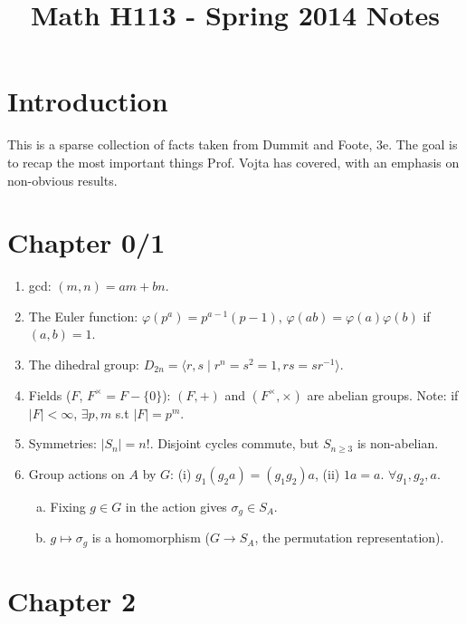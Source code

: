 \documentclass{article}
\title{Math H113 - Spring 2014 Notes}
\begin{document}
\maketitle

\section*{Introduction}

This is a sparse collection of facts taken from Dummit and Foote, 3e. The
goal is to recap the most important things Prof. Vojta has covered, with an
emphasis on non-obvious results.

\section*{Chapter 0/1}

\begin{enumerate}[1.]
    \item gcd: $(m, n) = am + bn$.
    \item The Euler function: $\varphi(p^a) = p^{a-1}(p - 1)$, $\varphi(ab)
        = \varphi(a)\varphi(b)$ if $(a, b) = 1$.
    \item The dihedral group: $D_{2n} = \langle r, s \mid r^n = s^2 = 1, rs
        = sr^{-1} \rangle$.
    \item Fields ($F$, $F^{\times} = F - \{0\}$): $(F, +)$ and $(F^{\times},
        \times)$ are abelian groups. Note: if $|F| < \infty$, $\exists p,m$
        s.t $|F| = p^m$.
    \item Symmetries: $|S_n| = n!$. Disjoint cycles commute, but $S_{n
        \geq 3}$ is non-abelian.
    \item Group actions on $A$ by $G$: (i) $g_1(g_2a) = (g_1g_2)a$, (ii) $1a
        = a$. $\forall g_1,g_2,a$.
        \begin{enumerate}[(a)]
            \item Fixing $g \in G$ in the action gives $\sigma_g \in S_A$.
            \item $g \mapsto \sigma_g$ is a homomorphism ($G \rightarrow
                S_A$, the permutation representation).
        \end{enumerate}
\end{enumerate}

\section*{Chapter 2}
\end{document}
